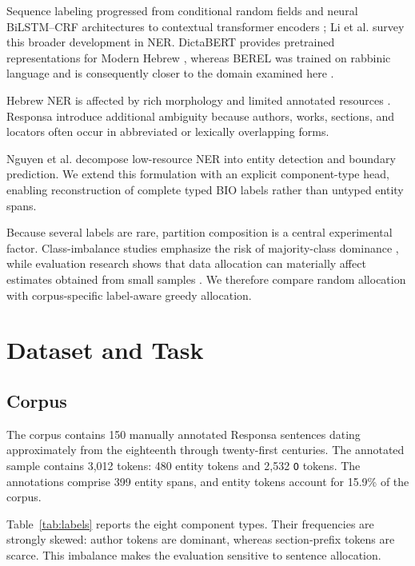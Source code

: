 \documentclass[conference,a4paper]{IEEEtran}
\begin{document}
Sequence labeling progressed from conditional random fields \cite{lafferty2001crf} and neural BiLSTM--CRF architectures \cite{ma2016bilstmcrf} to contextual transformer encoders \cite{devlin2018bert}; Li et al. \cite{li2022ner} survey this broader development in NER. DictaBERT provides pretrained representations for Modern Hebrew \cite{shmidman2023dictabert}, whereas BEREL was trained on rabbinic language and is consequently closer to the domain examined here \cite{shmidman2022berel}.

Hebrew NER is affected by rich morphology and limited annotated resources \cite{mordecai2005hebrew,itai2008,tsarfaty2019hebrewnlp}. Responsa introduce additional ambiguity because authors, works, sections, and locators often occur in abbreviated or lexically overlapping forms.

Nguyen et al. \cite{nguyen2023auc} decompose low-resource NER into entity detection and boundary prediction. We extend this formulation with an explicit component-type head, enabling reconstruction of complete typed BIO labels rather than untyped entity spans.

Because several labels are rare, partition composition is a central experimental factor. Class-imbalance studies emphasize the risk of majority-class dominance \cite{japkowicz2002}, while evaluation research shows that data allocation can materially affect estimates obtained from small samples \cite{kohavi1995}. We therefore compare random allocation with corpus-specific label-aware greedy allocation.

\section{Dataset and Task}

\subsection{Corpus}

The corpus contains 150 manually annotated Responsa sentences dating approximately from the eighteenth through twenty-first centuries. The annotated sample contains 3,012 tokens: 480 entity tokens and 2,532 \texttt{O} tokens. The annotations comprise 399 entity spans, and entity tokens account for 15.9\% of the corpus.

Table~\ref{tab:labels} reports the eight component types. Their frequencies are strongly skewed: author tokens are dominant, whereas section-prefix tokens are scarce. This imbalance makes the evaluation sensitive to sentence allocation.
\end{document}
